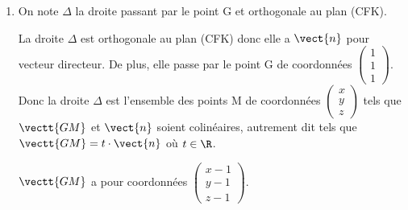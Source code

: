 \begin{enumerate}
\begin{enumerate}
Le vecteur $\vect{n}$ est donc orthogonal à deux vecteurs directeurs du plan (CFK) donc c'est un vecteur normal au plan (CFK).

		\item  
Le plan (CFK) est l'ensemble des points M de coordonnées
$\begin{pmatrix}
x \\ y \\ z
\end{pmatrix}$
tels que $\vectt{CM}$ et $\vect{n}$ soient orthogonaux, c'est-à-dire tels que $\vectt{CM}\cdot\vect{n}=0$.

$\vectt{CM}$ a pour coordonnées 
$\begin{pmatrix}
x-1 \\ y-1 \\ z
\end{pmatrix}$.

$\begin{gathered}\vectt{CM}\cdot\vect{n}=0
\iff
(x-1)\times 1 + (y-1)\times 2 + z\times 1=0\\
\phantom{\vectt{CM}\cdot\vectt{n}=0}
\iff
x-1+2y-2+z=0
\iff
x+2y+z-3=0\end{gathered}$

Le plan (CFK) a donc pour équation cartésienne $x+2y+z-3=0$.

	\end{enumerate}
	
\item On note $\Delta$ la droite passant par le point G et orthogonale au plan (CFK). 








La droite $\Delta$ est orthogonale au plan (CFK) donc elle a $\vect{n}$ pour vecteur directeur.
De plus, elle passe par le point G de coordonnées
$\begin{pmatrix}
1 \\ 1 \\ 1
\end{pmatrix}$.
Donc la droite $\Delta$ est l'ensemble des points M de coordonnées
$\begin{pmatrix}
x \\ y \\ z
\end{pmatrix}$
tels que $\vectt{GM}$ et $\vect{n}$ soient colinéaires, autrement dit tels que $\vectt{GM}=t\cdot\vect{n}$ où $t\in\R$.

$\vectt{GM}$ a pour coordonnées 
$\begin{pmatrix}
x-1 \\ y-1 \\ z-1
\end{pmatrix}$.


\end{enumerate}
